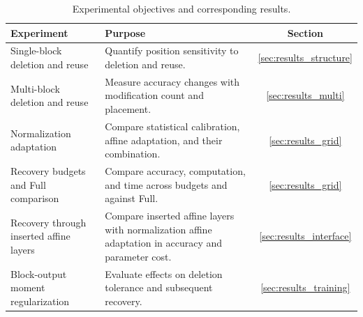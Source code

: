 \begin{table}[H]
    \caption{Experimental objectives and corresponding results.}
    \label{tab:experiment_objectives}
    \centering\small
    \setlength{\tabcolsep}{5pt}
    \renewcommand{\arraystretch}{1.12}
    \begin{tabularx}{\linewidth}{@{}l>{\raggedright\arraybackslash}Xc@{}}
        \toprule
        \rowcolor{black!5}
        \textbf{Experiment} & \textbf{Purpose} & \textbf{Section} \\
        \midrule
        Single-block deletion and reuse
        & Quantify position sensitivity to deletion and reuse.
        & \ref{sec:results_structure} \\
        Multi-block deletion and reuse
        & Measure accuracy changes with modification count and placement.
        & \ref{sec:results_multi} \\
        \midrule
        Normalization adaptation
        & Compare statistical calibration, affine adaptation, and their combination.
        & \ref{sec:results_grid} \\
        Recovery budgets and Full comparison
        & Compare accuracy, computation, and time across budgets and against Full.
        & \ref{sec:results_grid} \\
        Recovery through inserted affine layers
        & Compare inserted affine layers with normalization affine adaptation
        in accuracy and parameter cost.
        & \ref{sec:results_interface} \\
        \midrule
        Block-output moment regularization
        & Evaluate effects on deletion tolerance and subsequent recovery.
        & \ref{sec:results_training} \\
        \bottomrule
    \end{tabularx}
\end{table}
